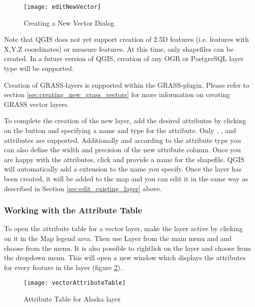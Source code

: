 \begin{figure}[ht]
   \begin{center}
   \caption{Creating a New Vector Dialog \nixcaption}\label{fig:newvectorlayer}\smallskip
   \texttt{[image: editNewVector]}
\end{center} 
\end{figure}

Note that QGIS does not yet support creation of 2.5D
features (i.e. features with X,Y,Z coordinates) or measure features. At this
time, only shapefiles can be created. In a future version of QGIS, creation of
any OGR or PostgreSQL layer type will be supported. 

Creation of GRASS-layers is supported within the GRASS-plugin. Please refer to section
\ref{sec:creating_new_grass_vectors} for more information on creating GRASS vector 
layers.

To complete the creation of the new layer, add the desired attributes by
clicking on the  button and specifying a name and type for the
attribute. Only , , and
 attributes are supported. Additionally and
according to the attribute type you can also define the width and precision
of the new attribute column. Once you are happy with the attributes, click
 and provide a name for the shapefile. QGIS will automatically add
a  extension to the name you specify. Once
the layer has been created, it will be added to the map and you can edit it in
the same way as described in Section \ref{sec:edit_existing_layer} above. 

\subsubsection{Working with the Attribute Table}\label{sec:attribute table}

To open the attribute table for a vector layer, make the layer active by clicking on it in the Map legend area. 
Then use  Layer from the main menu and and choose  
from the menu. It is also possible to rightlick on the layer and choose  
from the dropdown menu. This will open a new window which displays the attributes for every feature in the layer 
(figure \ref{fig:attributetable}).

\begin{figure}[ht]
   \begin{center}
   \caption{Attribute Table for Alaska layer \nixcaption}\label{fig:attributetable}\smallskip
   \texttt{[image: vectorAttributeTable]}
\end{center} 
\end{figure}

